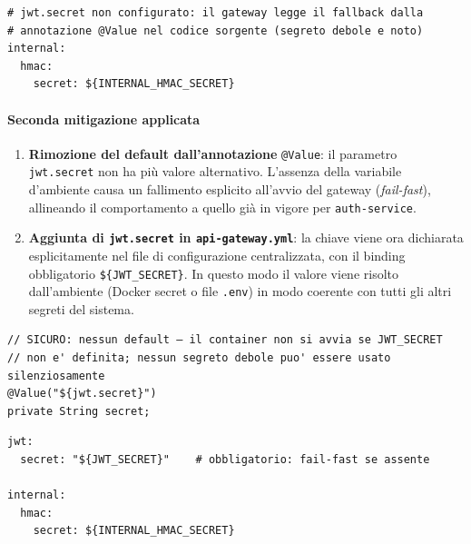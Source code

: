 ﻿\documentclass[a4paper,12pt]{report}
\begin{document}
\begin{insecurebox}[title={api-gateway.yml (baseline) --- proprieta' jwt.secret assente}]
\begin{lstlisting}[style=yaml]
# jwt.secret non configurato: il gateway legge il fallback dalla
# annotazione @Value nel codice sorgente (segreto debole e noto)
internal:
  hmac:
    secret: ${INTERNAL_HMAC_SECRET}
\end{lstlisting}
\end{insecurebox}

\paragraph{Seconda mitigazione applicata}
\begin{enumerate}
  \item \textbf{Rimozione del default dall'annotazione} \texttt{@Value}: il parametro
        \texttt{jwt.secret} non ha più valore alternativo. L'assenza della variabile d'ambiente
        causa un fallimento esplicito all'avvio del gateway (\emph{fail-fast}), allineando il
        comportamento a quello già in vigore per \texttt{auth-service}.

  \item \textbf{Aggiunta di \texttt{jwt.secret} in \texttt{api-gateway.yml}}: la chiave viene
        ora dichiarata esplicitamente nel file di configurazione centralizzata, con il binding
        obbligatorio \texttt{\$\{JWT\_SECRET\}}. In questo modo il valore viene risolto
        dall'ambiente (Docker secret o file \texttt{.env}) in modo coerente con tutti gli altri
        segreti del sistema.
\end{enumerate}

\begin{securebox}[title={JwtUtil.java (post-hardening) --- fail-fast senza fallback}]
\begin{lstlisting}[style=java]
// SICURO: nessun default — il container non si avvia se JWT_SECRET
// non e' definita; nessun segreto debole puo' essere usato silenziosamente
@Value("${jwt.secret}")
private String secret;
\end{lstlisting}
\end{securebox}

\begin{securebox}[title={api-gateway.yml (post-hardening) --- jwt.secret esplicito da env}]
\begin{lstlisting}[style=yaml]
jwt:
  secret: "${JWT_SECRET}"    # obbligatorio: fail-fast se assente

internal:
  hmac:
    secret: ${INTERNAL_HMAC_SECRET}
\end{lstlisting}
\end{securebox}
\end{document}
